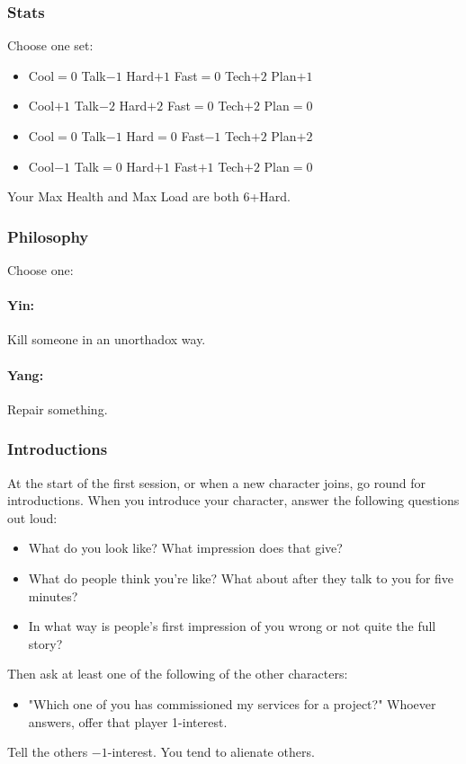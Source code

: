 \subsubsection{Stats}
Choose one set:
\begin{itemize}
\setlength\itemsep{0em}
\item Cool${=}0$ Talk$-1$ Hard$+1$ Fast${=}0$ Tech$+2$ Plan$+1$
\item Cool$+1$ Talk$-2$ Hard$+2$ Fast${=}0$ Tech$+2$ Plan${=}0$
\item Cool${=}0$ Talk$-1$ Hard${=}0$ Fast$-1$ Tech$+2$ Plan$+2$
\item Cool$-1$ Talk${=}0$ Hard$+1$ Fast$+1$ Tech$+2$ Plan${=}0$
\end{itemize}

Your Max Health and Max Load are both 6+Hard.

\subsubsection{Philosophy}
Choose one:
\paragraph{Yin:} Kill someone in an unorthadox way.
\paragraph{Yang:} Repair something.

\subsubsection{Introductions}
At the start of the first session, or when a new character joins, go round for introductions.
When you introduce your character, answer the following questions out loud:
\begin{itemize}
\item What do you look like? What impression does that give?
\item What do people think you're like? What about after they talk to you for five minutes?
\item In what way is people's first impression of you wrong or not quite the full story?
\end{itemize}

Then ask at least one of the following of the other characters:
\begin{itemize}
\item "Which one of you has commissioned my services for a project?" Whoever answers, offer that player 1-interest.
\end{itemize}
Tell the others $-1$-interest. You tend to alienate others.

